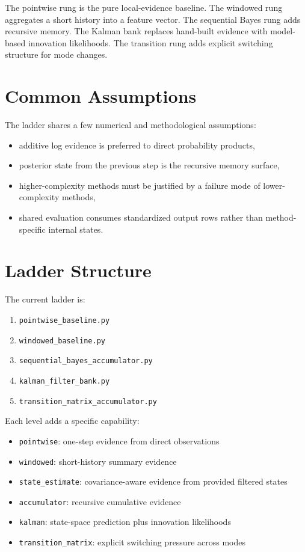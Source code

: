 \documentclass[11pt]{article}
\begin{document}
The pointwise rung is the pure local-evidence baseline. The windowed rung
aggregates a short history into a feature vector. The sequential Bayes rung
adds recursive memory. The Kalman bank replaces hand-built evidence with
model-based innovation likelihoods. The transition rung adds explicit switching
structure for mode changes.

\section{Common Assumptions}

The ladder shares a few numerical and methodological assumptions:
\begin{itemize}[leftmargin=1.5em]
    \item additive log evidence is preferred to direct probability products,
    \item posterior state from the previous step is the recursive memory surface,
    \item higher-complexity methods must be justified by a failure mode of
    lower-complexity methods,
    \item shared evaluation consumes standardized output rows rather than
    method-specific internal states.
\end{itemize}

\section{Ladder Structure}

The current ladder is:
\begin{enumerate}[leftmargin=1.8em]
    \item \texttt{pointwise\_baseline.py}
    \item \texttt{windowed\_baseline.py}
    \item \texttt{sequential\_bayes\_accumulator.py}
    \item \texttt{kalman\_filter\_bank.py}
    \item \texttt{transition\_matrix\_accumulator.py}
\end{enumerate}

Each level adds a specific capability:
\begin{itemize}[leftmargin=1.5em]
    \item \texttt{pointwise}: one-step evidence from direct observations
    \item \texttt{windowed}: short-history summary evidence
    \item \texttt{state\_estimate}: covariance-aware evidence from provided
    filtered states
    \item \texttt{accumulator}: recursive cumulative evidence
    \item \texttt{kalman}: state-space prediction plus innovation likelihoods
    \item \texttt{transition\_matrix}: explicit switching pressure across modes
\end{itemize}
\end{document}
